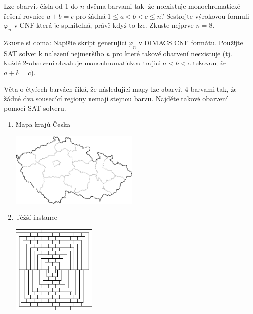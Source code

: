 \documentclass[a4paper,11pt]{amsart}
\begin{document}
\begin{problem}
    Lze obarvit čísla od 1 do $n$ dvěma barvami tak, že neexistuje monochromatické řešení rovnice
    $a+b=c$ pro žádná $1\leq a<b<c\leq n$? Sestrojte výrokovou formuli $\varphi_n$ v CNF která je splnitelná, právě když to lze. Zkuste nejprve $n=8$.
    
    Zkuste si doma: Napište skript generující $\varphi_n$ v DIMACS CNF formátu. Použijte SAT solver k nalezení nejmenšího $n$ pro které takové obarvení neexistuje (tj. každé 2-obarvení obsahuje monochromatickou trojici $a<b<c$ takovou, že $a+b=c$).
\end{problem}

    
\begin{problem}

    Věta o čtyřech barvách říká, že následující mapy lze obarvit 4 barvami tak, že žádné dva sousedící regiony nemají stejnou barvu. Najděte takové obarvení pomocí SAT solveru.
    \begin{multicols}{2}
    \begin{enumerate}
        \item Mapa krajů Česka  
        
        \vfill \includegraphics[width=0.5\textwidth]{files/map-coloring-czechia.png} \vfill
        
        \item Těžší instance  
        
        \vfill \includegraphics[width=0.33\textwidth]{files/map-coloring-hard.png} \vfill
    \end{enumerate}
    \end{multicols}

\end{problem}
\end{document}
